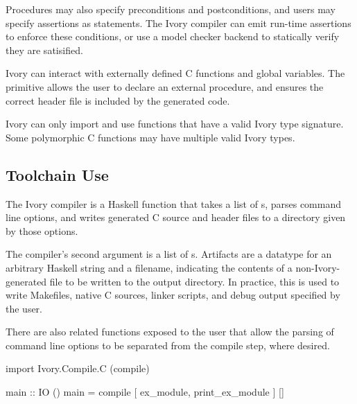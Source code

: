 Procedures may also specify preconditions and postconditions, and users may
specify assertions as statements. The Ivory compiler can emit run-time
assertions to enforce these conditions, or use a model checker backend to
statically verify they are satisified.


Ivory can interact with externally defined C functions and global
variables. The  primitive allows the user to declare an external
procedure, and ensures the correct header file is included by the generated
code.

Ivory can only import and use functions that have a valid Ivory type signature.
Some polymorphic C functions may have multiple valid Ivory types.

\subsection{Toolchain Use}
The Ivory compiler is a Haskell function that takes a list of s,
parses command line options, and writes generated C source and header files to
a directory given by those options.

The compiler's second argument is a list of s. Artifacts are a
datatype for an arbitrary Haskell string and a filename, indicating the contents
of a non-Ivory-generated file to be written to the output directory. In
practice, this is used to write Makefiles, native C sources, linker scripts, and debug output
specified by the user.

There are also related functions exposed to the user that allow the parsing
of command line options to be separated from the compile step, where desired.

\begin{code}
import Ivory.Compile.C (compile)

main :: IO ()
main = compile [ ex_module, print_ex_module ] []
\end{code}






